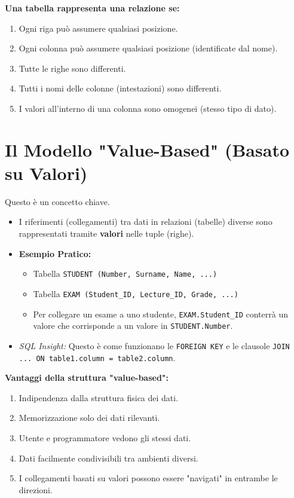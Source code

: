 \documentclass{article}
\begin{document}
	\textbf{Una tabella rappresenta una relazione se:}
	\begin{enumerate}
		\item Ogni riga può assumere qualsiasi posizione.
		\item Ogni colonna può assumere qualsiasi posizione (identificate dal nome).
		\item Tutte le righe sono differenti.
		\item Tutti i nomi delle colonne (intestazioni) sono differenti.
		\item I valori all'interno di una colonna sono omogenei (stesso tipo di dato).
	\end{enumerate}
	
	\section{Il Modello "Value-Based" (Basato su Valori)}
	Questo è un concetto chiave.
	\begin{itemize}
		\item I riferimenti (collegamenti) tra dati in relazioni (tabelle) diverse sono rappresentati tramite \textbf{valori} nelle tuple (righe).
		\item \textbf{Esempio Pratico:}
		\begin{itemize}
			\item Tabella \texttt{STUDENT (Number, Surname, Name, ...)}
			\item Tabella \texttt{EXAM (Student\_ID, Lecture\_ID, Grade, ...)}
			\item Per collegare un esame a uno studente, \texttt{EXAM.Student\_ID} conterrà un valore che corrisponde a un valore in \texttt{STUDENT.Number}.
		\end{itemize}
		\item \textit{SQL Insight:} Questo è come funzionano le \texttt{FOREIGN KEY} e le clausole \texttt{JOIN ... ON table1.column = table2.column}.
	\end{itemize}
	
	\textbf{Vantaggi della struttura "value-based":}
	\begin{enumerate}
		\item Indipendenza dalla struttura fisica dei dati.
		\item Memorizzazione solo dei dati rilevanti.
		\item Utente e programmatore vedono gli stessi dati.
		\item Dati facilmente condivisibili tra ambienti diversi.
		\item I collegamenti basati su valori possono essere "navigati" in entrambe le direzioni.
	\end{enumerate}
	
\end{document}
